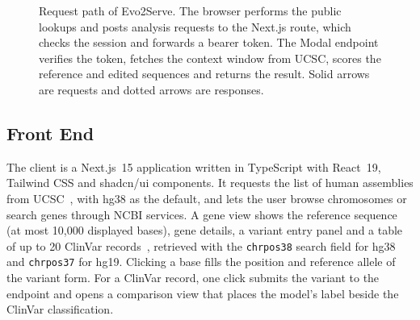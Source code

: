 \documentclass[10pt,journal,a4paper]{IEEEtran}
\begin{document}
\begin{figure}[!t]
\caption{Request path of Evo2Serve. The browser performs the public lookups and posts analysis requests to the Next.js route, which checks the session and forwards a bearer token. The Modal endpoint verifies the token, fetches the context window from UCSC, scores the reference and edited sequences and returns the result. Solid arrows are requests and dotted arrows are responses.}
\label{fig:arch}
\end{figure}

\subsection{Front End}
The client is a Next.js~15 application written in TypeScript with React~19, Tailwind CSS and shadcn/ui components. It requests the list of human assemblies from UCSC~\cite{lee2022ucsc,lee2020ucscapi}, with hg38 as the default, and lets the user browse chromosomes or search genes through NCBI services. A gene view shows the reference sequence (at most 10{,}000 displayed bases), gene details, a variant entry panel and a table of up to 20 ClinVar records~\cite{landrum2024clinvar}, retrieved with the \texttt{chrpos38} search field for hg38 and \texttt{chrpos37} for hg19. Clicking a base fills the position and reference allele of the variant form. For a ClinVar record, one click submits the variant to the endpoint and opens a comparison view that places the model's label beside the ClinVar classification.
\end{document}
